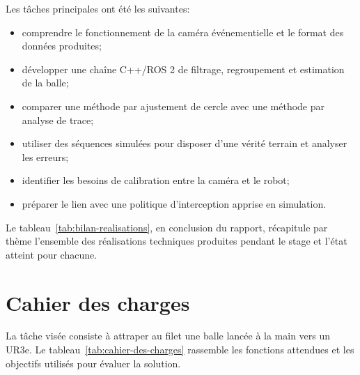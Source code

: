 \documentclass[a4paper,11pt]{report}
\begin{document}
Les tâches principales ont été les suivantes:
\begin{itemize}
  \item comprendre le fonctionnement de la caméra événementielle et le format des données produites;
  \item développer une chaîne C++/ROS 2 \cite{ros2-docs} de filtrage, regroupement et estimation de la balle;
  \item comparer une méthode par ajustement de cercle avec une méthode par analyse de trace;
  \item utiliser des séquences simulées pour disposer d'une vérité terrain et analyser les erreurs;
  \item identifier les besoins de calibration entre la caméra et le robot;
  \item préparer le lien avec une politique d'interception apprise en simulation.
\end{itemize}

Le tableau~\ref{tab:bilan-realisations}, en conclusion du rapport, récapitule par thème l'ensemble des réalisations techniques produites pendant le stage et l'état atteint pour chacune.

\section{Cahier des charges}
\label{sec:cahier-des-charges}

La tâche visée consiste à attraper au filet une balle lancée à la main vers un
UR3e. Le tableau~\ref{tab:cahier-des-charges} rassemble les fonctions attendues
et les objectifs utilisés pour évaluer la solution.
\end{document}

